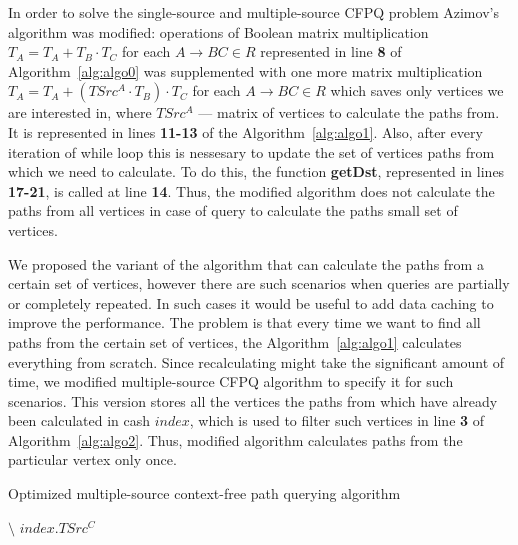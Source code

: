 In order to solve the single-source and multiple-source CFPQ problem Azimov's algorithm was modified: operations of Boolean matrix multiplication $T_A = T_A + T_B \cdot T_C$ for each $A \rightarrow BC \in R$ represented in line \textbf{8} of Algorithm~\ref{alg:algo0} was supplemented with one more matrix multiplication $T_A = T_A + (TSrc^A \cdot T_B) \cdot T_C$ for each $A \rightarrow BC \in R$ which saves only vertices we are interested in, where $TSrc^A$ --- matrix of vertices to calculate the paths from. It is represented in lines \textbf{11-13} of the Algorithm~\ref{alg:algo1}. Also, after every iteration of while loop this is nessesary to update the set of vertices paths from which we need to calculate. To do this, the function \textbf{getDst}, represented in lines \textbf{17-21}, is called at line \textbf{14}. Thus, the modified algorithm does not calculate the paths from all vertices in case of query to calculate the paths small set of vertices.

We proposed the variant of the algorithm that can calculate the paths from a certain set of vertices, however there are such scenarios when queries are partially or completely repeated. In such cases it would be useful to add data caching to improve the performance. The problem is that every time we want to find all paths from the certain set of vertices, the Algorithm~\ref{alg:algo1} calculates everything from scratch. Since recalculating might take the significant amount of time, we modified multiple-source CFPQ algorithm to specify it for such scenarios. This version stores all the vertices the paths from which have already been calculated in cash $index$, which is used to filter such vertices in line \textbf{3} of Algorithm~\ref{alg:algo2}. Thus, modified algorithm calculates paths from the particular vertex only once.
\begin{algorithm}
\begin{algorithmic}[1]
\caption{Optimized multiple-source context-free path querying algorithm}
\label{alg:algo2}

    \EndFor


             $\setminus$ $index.TSrc^C$
        \EndFor
    \EndWhile
\EndFunction


\end{algorithmic}
\end{algorithm}

